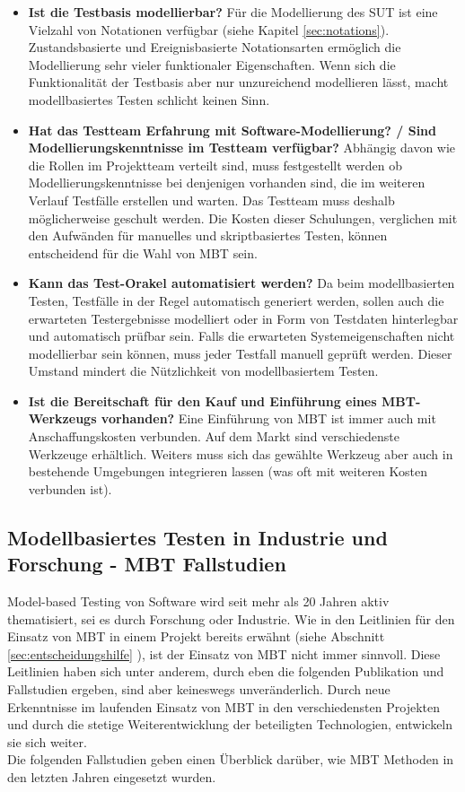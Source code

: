 \begin{itemize}
\item \textbf{Ist die Testbasis modellierbar?}
Für die Modellierung des \Gls{SUT} ist eine Vielzahl von Notationen verfügbar (siehe Kapitel \ref{sec:notations}). Zustandsbasierte und Ereignisbasierte Notationsarten ermöglich die Modellierung sehr vieler funktionaler Eigenschaften. Wenn sich die Funktionalität der Testbasis aber nur unzureichend modellieren lässt, macht modellbasiertes Testen schlicht keinen Sinn.
\item \textbf{Hat das Testteam Erfahrung mit Software-Modellierung? / Sind Modellierungskenntnisse im Testteam verfügbar?}
Abhängig davon wie die Rollen im Projektteam verteilt sind, muss festgestellt werden ob Modellierungskenntnisse bei denjenigen vorhanden sind, die im weiteren Verlauf Testfälle erstellen und warten. Das Testteam muss deshalb möglicherweise geschult werden. Die Kosten dieser Schulungen, verglichen mit den Aufwänden für manuelles und skriptbasiertes Testen, können entscheidend für die Wahl von \Gls{MBT} sein.
\item \textbf{Kann das Test-Orakel automatisiert werden?}
Da beim modellbasierten Testen, Testfälle in der Regel automatisch generiert werden, sollen auch die erwarteten Testergebnisse modelliert oder in Form von Testdaten hinterlegbar und automatisch prüfbar sein. Falls die erwarteten Systemeigenschaften nicht modellierbar sein können, muss jeder Testfall manuell geprüft werden. Dieser Umstand mindert die Nützlichkeit von modellbasiertem Testen.
\item \textbf{Ist die Bereitschaft für den Kauf und Einführung eines MBT-Werkzeugs vorhanden?}
Eine Einführung von \Gls{MBT} ist immer auch mit Anschaffungskosten verbunden. Auf dem Markt sind verschiedenste Werkzeuge erhältlich. Weiters muss sich das gewählte Werkzeug aber auch in bestehende Umgebungen integrieren lassen (was oft mit weiteren Kosten verbunden ist).
\end{itemize}

\subsection{Modellbasiertes Testen in Industrie und Forschung - \Gls{MBT} Fallstudien}

Model-based Testing von Software wird seit mehr als 20 Jahren aktiv thematisiert\cite{utting_practical_2007}, sei es durch Forschung oder Industrie. Wie in den Leitlinien für den Einsatz von \Gls{MBT} in einem Projekt bereits erwähnt (siehe Abschnitt \ref{sec:entscheidungshilfe} ), ist der Einsatz von \Gls{MBT} nicht immer sinnvoll. Diese Leitlinien haben sich unter anderem, durch eben die folgenden Publikation und Fallstudien ergeben, sind aber keineswegs unveränderlich. Durch neue Erkenntnisse im laufenden Einsatz von \Gls{MBT} in den verschiedensten Projekten und durch die stetige Weiterentwicklung der beteiligten Technologien, entwickeln sie sich weiter.\\
Die folgenden Fallstudien geben einen Überblick darüber, wie \Gls{MBT} Methoden in den letzten Jahren eingesetzt wurden.

